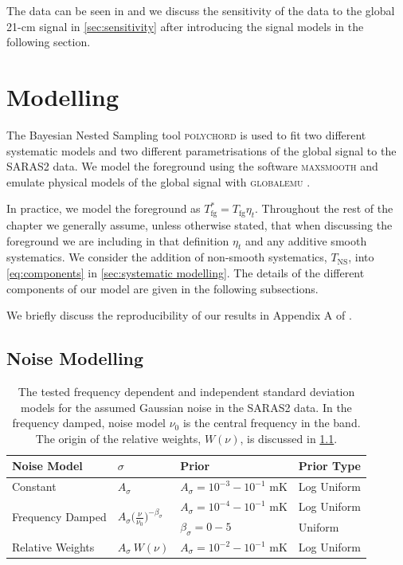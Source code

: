 The data can be seen in \cite{Singh_saras2_2017, Singh_saras2_2018} and we discuss the sensitivity of the data to the global 21-cm signal in \cref{sec:sensitivity} after introducing the signal models in the following section.

\section{Modelling}
\label{sec:modelling}

The Bayesian Nested Sampling tool \textsc{polychord} \citep{Handley2015a, Handley2015b} is used to fit two different systematic models and two different parametrisations of the global signal to the SARAS2 data. We model the foreground using the software \textsc{maxsmooth} \citep{Bevins2020, Bevins_maxsmooth_2021} and emulate physical models of the global signal with \textsc{globalemu} \citep[][]{Bevins_globalemu_2021}.

In practice, we model the foreground as $T_\mathrm{fg}^* = T_\mathrm{fg}\eta_t$. Throughout the rest of the chapter we generally assume, unless otherwise stated, that when discussing the foreground we are including in that definition $\eta_t$ and any additive smooth systematics. We consider the addition of non-smooth systematics, $T_\mathrm{NS}$, into \cref{eq:components} in \cref{sec:systematic modelling}. The details of the different components of our model are given in the following subsections. 

We briefly discuss the reproducibility of our results in Appendix A of \cite{Bevins_SARAS2_2022}.

\subsection{Noise Modelling}
\label{sec:noise_models}

\begin{table}
    \centering
    \begin{tabular}{|p{3cm}|p{2cm}|p{4cm}|p{3cm}|}
        \hline
        Noise Model & $\sigma$ & Prior & Prior Type \\
        \hline
        \hline
        Constant & $A_{\sigma}$ & $A_{\sigma}=10^{-3}-10^{-1}$ mK & Log Uniform\\
        \hline
        \multirow{2}{1.5cm}{Frequency Damped} & \multirow{2}{*}{$A_{\sigma}\bigg(\frac{\nu}{\nu_0}\bigg)^{-\beta_{\sigma}}$} & $A_{\sigma}=10^{-4}-10^{-1}$ mK & Log Uniform \\
        \cline{3-4}
        & & $\beta_{\sigma} = 0 - 5$ & Uniform \\
        \hline
         Relative Weights & $A_{\sigma}~W(\nu)$ & $A_{\sigma} = 10^{-2}-10^{-1}$ mK & Log Uniform\\
         \hline
    \end{tabular}
    \caption{The tested frequency dependent and independent standard deviation models for the assumed Gaussian noise in the SARAS2 data. In the frequency damped, noise model $\nu_0$ is the central frequency in the band. The origin of the relative weights, $W(\nu)$, is discussed in \cref{sec:noise_models}.}
    \label{tab:noise_models}
\end{table}

